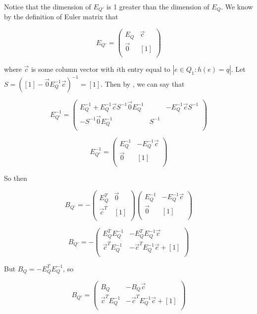 \documentclass{amsart}
\theoremstyle{theorem}
\theoremstyle{theorem*}
\theoremstyle{definition}
\begin{document}
Notice that the dimension of $E_{Q'}$ is 1 greater than the dimension of $E_Q$. We know by the definition of Euler matrix
that

$$E_{Q'} = \begin{pmatrix}
    E_Q & \vec{c} \\ \vec{0} & [1] \\
\end{pmatrix}$$

where $\vec{c}$ is some column vector with $i$th entry equal to $|e \in Q_1 : h(e) = q|$. 
Let $S = ([1] - \vec{0} E_Q^{-1} \vec{c})^{-1} = [1]$. Then by \cite{b}, we can say that

$$E_{Q'}^{-1} = \begin{pmatrix}
    E_Q^{-1} + E_Q^{-1} \vec{c} S^{-1} \vec{0} E_Q^{-1} && - E_Q^{-1} \vec{c} S^{-1}\\
    - S^{-1} \vec{0} E_Q^{-1} & S^{-1} \\
\end{pmatrix}$$

$$E_{Q'}^{-1} = \begin{pmatrix}
    E_Q^{-1} & -E_Q^{-1} \vec{c} \\
    \vec{0} & [1] \\
\end{pmatrix}$$

So then 

$$B_{Q'} = - \begin{pmatrix}
    E_Q^{T} & \vec{0} \\
    \vec{c}^T & [1] \\
\end{pmatrix}
\begin{pmatrix}
    E_Q^{-1} & -E_Q^{-1} \vec{c} \\
    \vec{0} & [1] \\
\end{pmatrix}$$

$$B_{Q'} = - \begin{pmatrix}
    E_Q^T E_Q^{-1} &  - E_Q^T E_Q^{-1} \vec{c} \\
    \vec{c}^T E_Q^{-1} & - \vec{c}^T E_Q^{-1} \vec{c} + [1] \\
\end{pmatrix}$$

But $B_Q = -E_Q^T E_Q^{-1}$, so

$$B_{Q'} = \begin{pmatrix}
    B_Q &  - B_Q \vec{c} \\
    \vec{c}^T E_Q^{-1} & - \vec{c}^T E_Q^{-1} \vec{c} + [1] \\
\end{pmatrix}$$
\end{document}
